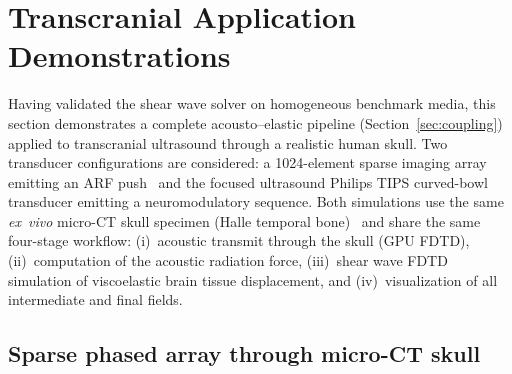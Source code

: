\documentclass{iopjournal}
\begin{document}
\section{Transcranial Application Demonstrations}
\label{sec:transcranial_demos}

Having validated the shear wave solver on homogeneous benchmark media, this
section demonstrates a complete acousto--elastic pipeline
(Section~\ref{sec:coupling}) applied to transcranial ultrasound through
a realistic human skull. Two transducer configurations are considered: a
1024-element sparse imaging array emitting an ARF push~\cite{mccall2023sparse} and the focused ultrasound Philips TIPS curved-bowl transducer emitting a neuromodulatory sequence.
Both simulations use the same \emph{ex~vivo} micro-CT skull specimen (Halle
temporal bone)~\cite{kirchner2022skull} and share the same four-stage workflow: (i)~acoustic transmit
through the skull (GPU FDTD), (ii)~computation of the acoustic radiation force,
(iii)~shear wave FDTD simulation of viscoelastic brain tissue displacement,
and (iv)~visualization of all intermediate and final fields.

\subsection{Sparse phased array through micro-CT skull}
\label{sec:sparse_demo}
\end{document}
